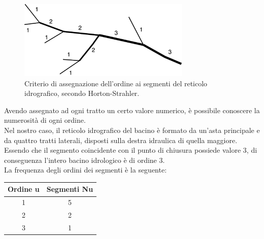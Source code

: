 \begin{figure}[H]\centering
    \includegraphics[scale=.75]{immagini/ordine_horton.png}
    \caption{Criterio di assegnazione dell'ordine ai segmenti del reticolo idrografico, secondo Horton-Strahler.}
  \label{ordine_horton}
\end{figure}
Avendo assegnato ad ogni tratto un certo valore numerico, è possibile conoscere la numerosità di ogni ordine. \\
Nel nostro caso, il reticolo idrografico del bacino è formato da un'asta principale e da quattro tratti laterali, disposti sulla destra idraulica di quella maggiore.\\
Essendo che il segmento coincidente con il punto di chiusura possiede valore 3, di conseguenza l'intero bacino idrologico è di ordine 3.\\
La frequenza degli ordini dei segmenti è la seguente:
\begin{table}[H] \centering
    \begin{tabular}{cc}
\toprule
    Ordine u & Segmenti Nu \\
\midrule    
    1        & 5           \\
    2        & 2           \\
    3        & 1           \\
\bottomrule    
\end{tabular}
\end{table}